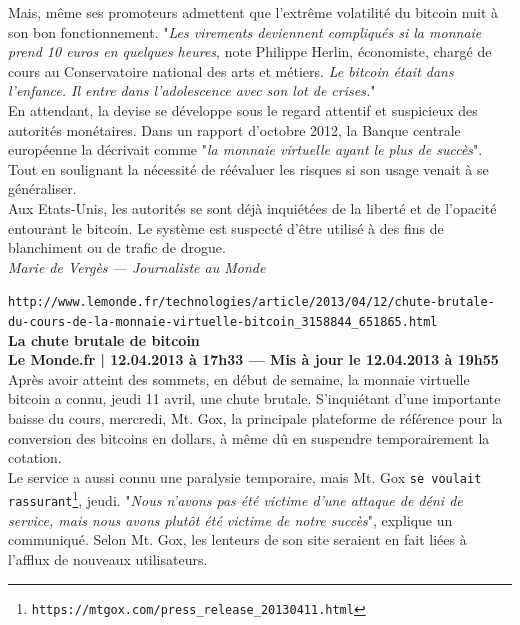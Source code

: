\documentclass[11pt,twoside,a4paper]{article}
\begin{document}
Mais, m{\^e}me ses promoteurs admettent que l'extr{\^e}me volatilit{\'e} du bitcoin nuit {\`a} son bon fonctionnement. "\emph{Les virements deviennent compliqu{\'e}s si la monnaie prend 10 euros en quelques heures}, note Philippe Herlin, {\'e}conomiste, charg{\'e} de cours au Conservatoire national des arts et m{\'e}tiers. \emph{Le bitcoin {\'e}tait dans l'enfance. Il entre dans l'adolescence avec son lot de crises.}" ~\\

En attendant, la devise se d{\'e}veloppe sous le regard attentif et suspicieux des autorit{\'e}s mon{\'e}taires. Dans un rapport d'octobre 2012, la Banque centrale europ{\'e}enne la d{\'e}crivait comme "\emph{la monnaie virtuelle ayant le plus de succ{\`e}s}". Tout en soulignant la n{\'e}cessit{\'e} de r{\'e}{\'e}valuer les risques si son usage venait {\`a} se g{\'e}n{\'e}raliser. ~\\

Aux Etats-Unis, les autorit{\'e}s se sont d{\'e}j{\`a} inqui{\'e}t{\'e}es de la libert{\'e} et de l'opacit{\'e} entourant le bitcoin. Le syst{\`e}me est suspect{\'e} d'{\^e}tre utilis{\'e} {\`a} des fins de blanchiment ou de trafic de drogue. ~\\

\emph{Marie de Verg{\`e}s --- Journaliste au Monde}~\\

\clearpage

\texttt{http://www.lemonde.fr/technologies/article/2013/04/12/chute-brutale-du-cours-de-la-monnaie-virtuelle-bitcoin\_3158844\_651865.html}~\\

\textbf{La chute brutale de bitcoin}~\\

\textbf{\small Le Monde.fr | 12.04.2013 {\`a} 17h33 --- Mis {\`a} jour le 12.04.2013 {\`a} 19h55}~\\

Apr{\`e}s avoir atteint des sommets, en d{\'e}but de semaine, la monnaie virtuelle bitcoin a connu, jeudi 11 avril, une chute brutale. S'inqui{\'e}tant d'une importante baisse du cours, mercredi, Mt. Gox, la principale plateforme de r{\'e}f{\'e}rence pour la conversion des bitcoins en dollars, {\`a} m{\^e}me d{\^u} en suspendre temporairement la cotation. ~\\

Le service a aussi connu une paralysie temporaire, mais Mt. Gox \texttt{se voulait rassurant\footnote{\texttt{https://mtgox.com/press\_release\_20130411.html}}}, jeudi. "\emph{Nous n'avons pas {\'e}t{\'e} victime d'une attaque de d{\'e}ni de service, mais nous avons plut{\^o}t {\'e}t{\'e} victime de notre succ{\`e}s}", explique un communiqu{\'e}. Selon Mt. Gox, les lenteurs de son site seraient en fait li{\'e}es {\`a} l'afflux de nouveaux utilisateurs. ~\\
\end{document}
